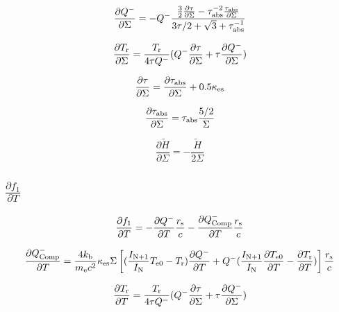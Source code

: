 \documentclass[11pt, oneside]{article}   	%
\begin{document}
\begin{equation}
	\frac{\partial Q^-}{\partial\Sigma} = -Q^-\frac{\frac{3}{2}\frac{\partial\tau}{\partial\Sigma}-\tau^{-2}_{\rm abs}\frac{\tau_{\rm abs}}{\partial\Sigma}}{3\tau/2 + \sqrt{3} + \tau_{\rm abs}^{-1}}
\end{equation}

\begin{equation}
	\frac{\partial T_{\rm r}}{\partial\Sigma} = %
			\frac{T_{\rm r}}{4\tau Q^-}(Q^-\frac{\partial\tau}{\partial\Sigma} + \tau\frac{\partial Q^-}{\partial\Sigma})
\end{equation}

\begin{equation}
	\frac{\partial\tau}{\partial\Sigma} = \frac{\partial\tau_{\rm abs}}{\partial\Sigma} + 0.5\kappa_{\rm es}
\end{equation}

\begin{equation}
	\frac{\partial\tau_{\rm abs}}{\partial\Sigma} = \tau_{\rm abs}\frac{5/2}{\Sigma}
\end{equation}

\begin{equation}
	\frac{\partial \tilde H}{\partial \Sigma} = -\frac{\tilde H}{2\Sigma}
\end{equation}

\subsection*{$\displaystyle\frac{\partial f_1}{\partial T}$}
\begin{equation}
	\frac{\partial f_1}{\partial T} = - \frac{\partial Q^-}{\partial T}\frac{r_{\rm s}}{c} - \frac{\partial Q^-_{\rm Comp}}{\partial T}\frac{r_{\rm s}}{c}
\end{equation}

\begin{equation}
	\frac{\partial Q^-_{\rm Comp}}{\partial T} = \frac{4k_{\rm b}}{m_{\rm e}c^2}\kappa_{\rm es}\Sigma\left[ (\frac{I_{\rm N+1}}{I_{\rm N}}T_{\rm e0} - T_{\rm r})\frac{\partial Q^-}{\partial T} + Q^-(\frac{I_{\rm N+1}}{I_{\rm N}}\frac{\partial T_{\rm e0}}{\partial T} - \frac{\partial T_{\rm r}}{\partial T})\right]\frac{r_{\rm s}}{c}
\end{equation}

\begin{equation}
	\frac{\partial T_{\rm r}}{\partial T} = %
			\frac{T_{\rm r}}{4\tau Q^-}(Q^-\frac{\partial\tau}{\partial\Sigma} + \tau\frac{\partial Q^-}{\partial\Sigma})
\end{equation}
\end{document}
